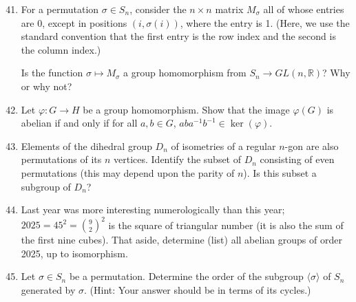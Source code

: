 \documentclass[12pt]{article}
\newcommand{\RR}{{\mathbb R}}
\begin{document}
\begin{enumerate}
\setcounter{enumi}{40}

\item
  For a permutation $\sigma\in S_n$, consider the $n\times n$ matrix $M_\sigma$ all of whose entries are 0,
  except in positions $(i, \sigma(i))$, where the entry is 1.
  (Here, we use the standard convention that the first entry is the row index and the second is the column index.)
 
  Is the function $\sigma \longmapsto M_\sigma$ a group homomorphism from $S_n\to GL(n,\RR)$?
  Why or why not?

\item
  Let $\varphi\colon G\to H$ be a group homomorphism.
  Show that the image $\varphi(G)$ is abelian if and only if for all $a,b\in G$, $ab a^{-1} b^{-1}\in \ker(\varphi)$.

\item
  Elements of the dihedral group $D_n$ of isometries of a regular $n$-gon are also permutations of its $n$ vertices.
  Identify the subset of $D_n$ consisting of even permutations (this may depend upon the parity of $n$).
  Is this subset a subgroup of $D_n$?

\item
  Last year was more interesting numerologically than this year;
  $2025= 45^2 = \binom{9}{2}^2$ is the square of  triangular number (it is also the sum of the first nine cubes).
  That aside, determine (list) all abelian groups of order 2025, up to isomorphism.


\item
  Let $\sigma\in S_n$ be a permutation.
  Determine the order of the subgroup $\langle \sigma \rangle$ of $S_n$ generated by $\sigma$.
  (Hint: Your answer should be in terms of its cycles.)



\end{enumerate}
\end{document}
